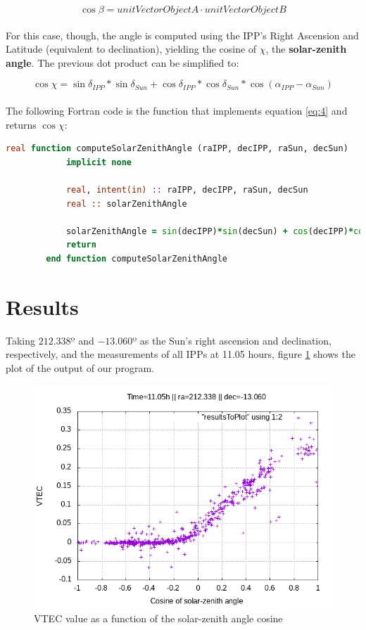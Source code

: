 \begin{equation} \label{eq:3}
\cos \beta = unitVectorObjectA \cdot unitVectorObjectB
\end{equation}\\

For this case, though, the angle is computed using the IPP's Right Ascension and Latitude (equivalent to declination), yielding the cosine of $\chi$, the \textbf{solar-zenith angle}. The previous dot product can be simplified to:

\begin{equation} \label{eq:4}
\cos \chi = \sin\delta_{IPP}*\sin\delta_{Sun} + \cos\delta_{IPP}*\cos\delta_{Sun}*\cos(\alpha_{IPP} - \alpha_{Sun})
\end{equation}\\

The following Fortran code is the function that implements equation \ref{eq:4} and returns $\cos \chi$:

\begin{lstlisting}[language=Fortran, caption=Computation of the solar-zenith a angle's cosine]
real function computeSolarZenithAngle (raIPP, decIPP, raSun, decSun)
			implicit none

			real, intent(in) :: raIPP, decIPP, raSun, decSun
			real :: solarZenithAngle
			
			solarZenithAngle = sin(decIPP)*sin(decSun) + cos(decIPP)*cos(decSun)*cos(raIPP - raSun)
			return
		end function computeSolarZenithAngle
\end{lstlisting}

\section{Results}

Taking $212.338º$ and $-13.060º$ as the Sun's right ascension and declination, respectively, and the measurements of all IPPs at 11.05 hours, figure \ref{fig:results} shows the plot of the output of our program.

\begin{figure}[!htb]
\begin{centering}
	\includegraphics[width=0.5\linewidth]{images/ch4/resultSunTest.png}
	\caption{VTEC value as a function of the solar-zenith angle cosine}
	\label{fig:results}
\end{centering}
\end{figure}

